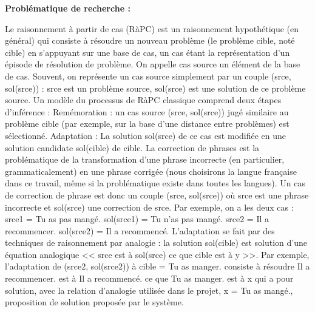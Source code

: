 \documentclass[11pt]{article}
\begin{document}
\vspace*{10mm}


{\bfseries Probl\'ematique de recherche : }
\newline
\vspace*{2mm}

Le raisonnement \`{a} partir de cas (R\`{a}PC) est un raisonnement hypoth\'etique (en g\'en\'eral) qui consiste \`{a} r\'esoudre un nouveau probl\`{e}me (le probl\`{e}me cible, not\'e cible) en s'appuyant sur une base de cas, un cas \'etant la repr\'esentation d'un \'episode de r\'esolution de probl\`{e}me. On appelle cas source un \'el\'ement de la base de cas. Souvent, on repr\'esente un cas source simplement par un couple (srce, sol(srce)) : srce est un probl\`{e}me source, sol(srce) est une solution de ce probl\`{e}me source. Un mod\`{e}le du processus de R\`{a}PC classique comprend deux \'etapes d'inf\'erence : 
\newline
Rem\'emoration : un cas source (srce, sol(srce)) jug\'e similaire au probl\`{e}me cible (par exemple, sur la base d'une distance entre probl\`{e}mes) est s\'electionn\'e. 
\newline
Adaptation : La solution sol(srce) de ce cas est modifi\'ee en une solution candidate sol(cible) de cible. 
\newline
La correction de phrases est la probl\'ematique de la transformation d'une phrase incorrecte (en particulier, grammaticalement) en une phrase corrig\'ee (nous choisirons la langue fran\c{c}aise dans ce travail, m\^eme si la probl\'ematique existe dans toutes les langues). Un cas de correction de phrase est donc un couple (srce, sol(srce)) o\`{u} srce est une phrase incorrecte et sol(srce) une correction de srce. Par exemple, on a les deux cas : 
\newline
srce1 = Tu as pas mang\'e. sol(srce1) = Tu n'as pas mang\'e. 
\newline
srce2 = Il a recommencer. sol(srce2) = Il a recommenc\'e. 
\newline
L'adaptation se fait par des techniques de raisonnement par analogie : la solution sol(cible) est solution d'une \'equation analogique << srce est \`{a} sol(srce) ce que cible est \`{a} y >>. Par exemple, l'adaptation de (srce2, sol(srce2)) \`{a} cible = Tu as manger. consiste \`{a} r\'esoudre Il a recommencer. est \`{a} Il a recommenc\'e. ce que Tu as manger. est \`{a} x qui a pour solution, avec la relation d'analogie utilis\'ee dans le projet, x = Tu as mang\'e., proposition de solution propos\'ee par le syst\`{e}me. 
\newline
\end{document}
